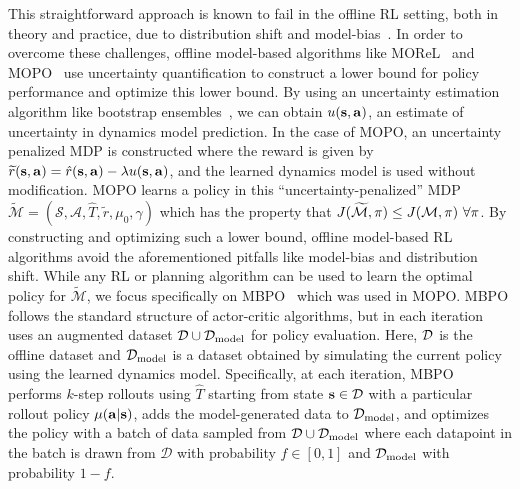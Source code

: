 This straightforward approach is known to fail in the offline RL setting, both in theory and practice, due to distribution shift and model-bias~\cite{RossB12, kidambi2020morel}. In order to overcome these challenges, offline model-based algorithms like MOReL~\cite{kidambi2020morel} and MOPO~\cite{yu2020mopo} use uncertainty quantification to construct a lower bound for policy performance and optimize this lower bound. By using an uncertainty estimation algorithm like bootstrap ensembles~\cite{OsbandAC18, Azizzadenesheli18, POLO}, we can obtain $u(\mathbf{s}, \mathbf{a})$, an estimate of uncertainty in dynamics model prediction. In the case of MOPO, an uncertainty penalized MDP is constructed where the reward is given by
$\widetilde{r} (\mathbf{s}, \mathbf{a}) = \hat{r}(\mathbf{s}, \mathbf{a}) - \lambda u(\mathbf{s}, \mathbf{a})$,
and the learned dynamics model is used without modification. MOPO learns a policy in this ``uncertainty-penalized'' MDP $\widetilde{\mathcal{M}} = (\mathcal{S}, \mathcal{A}, \widehat{T}, \widetilde{r}, \mu_0, \gamma)$ which has the property that $J(\widetilde{\mathcal{M}}, \pi) \leq J(\mathcal{M}, \pi) \ \forall \pi$. 
By constructing and optimizing such a lower bound, offline model-based RL algorithms avoid the aforementioned pitfalls like model-bias and distribution shift.
While any RL or planning algorithm can be used to learn the optimal policy for $\widetilde{\mathcal{M}}$, we focus specifically on MBPO~\cite{janner2019trust, sutton1991dyna} which was used in MOPO. MBPO follows the standard structure of actor-critic algorithms, but in each iteration uses an augmented dataset $\mathcal{D} \cup \mathcal{D}_{\text{model}}$ for policy evaluation. Here, $\mathcal{D}$ is the offline dataset and $\mathcal{D}_{\text{model}}$ is a dataset obtained by simulating the current policy using the learned dynamics model. 
Specifically, at each iteration, MBPO performs $k$-step rollouts using $\widehat{T}$ starting from state $\mathbf{s} \in \mathcal{D}$ with a particular rollout policy $\mu(\mathbf{a}|\mathbf{s})$, adds the model-generated data to $\mathcal{D}_{\text{model}}$, and optimizes the policy with a batch of data sampled from $\mathcal{D} \cup \mathcal{D}_{\text{model}}$ where each datapoint in the batch is drawn from $\mathcal{D}$ with probability $f \in [0, 1]$ and $\mathcal{D}_{\text{model}}$ with probability $1 - f$.



